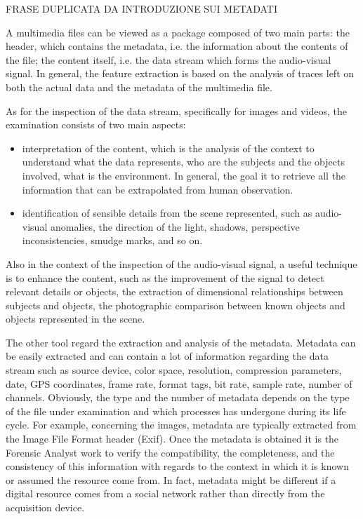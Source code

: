 {FRASE DUPLICATA DA INTRODUZIONE SUI METADATI}

A multimedia files can be viewed as a package composed of two main parts: the header, which contains the metadata, i.e. the information about the contents of the file; the content itself, i.e. the data stream which forms the audio-visual signal.
In general, the feature extraction is based on the analysis of traces left on both the actual data and the metadata of the multimedia file.

As for the inspection of the data stream, specifically for images and videos, the examination consists of two main aspects:
\begin{itemize}
\item interpretation of the content, which is the analysis of the context to understand what the data represents, who are the subjects and the objects involved, what is the environment. In general, the goal it to retrieve all the information that can be extrapolated from human observation.
\item identification of sensible details from the scene represented, such as audio-visual anomalies, the direction of the light, shadows, perspective inconsistencies, smudge marks, and so on.
\end{itemize}

Also in the context of the inspection of the audio-visual signal, a useful technique is to enhance the content, such as the improvement of the signal to detect relevant details or objects, the extraction of dimensional relationships between subjects and objects, the photographic comparison between known objects and objects represented in the scene.

The other tool regard the extraction and analysis of the metadata. Metadata can be easily extracted and can contain a lot of information regarding the data stream such as source device, color space, resolution, compression parameters, date, GPS coordinates, frame rate, format tags, bit rate, sample rate, number of channels. Obviously, the type and the number of metadata depends on the type of the file under examination and which processes has undergone during its life cycle. For example, concerning the images, metadata are typically extracted from the Image File Format header (Exif). Once the metadata is obtained it is the Forensic Analyst work to verify the compatibility, the completeness, and the consistency of this information with regards to the context in which it is known or assumed the resource come from. In fact, metadata might be different if a digital resource comes from a social network rather than directly from the acquisition device.

